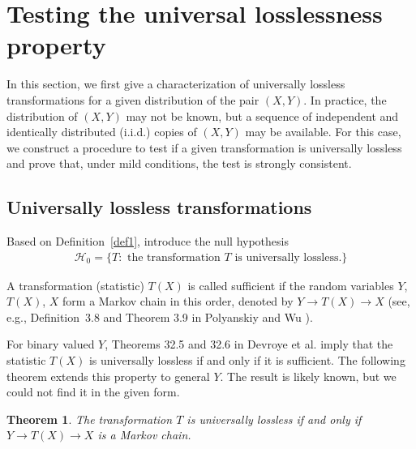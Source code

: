 \documentclass[11pt]{article}
\newtheorem{theorem}{Theorem}
\begin{document}
\section{Testing the universal losslessness property}

\label{sec-lossless}

In this section, we first give a characterization of universally lossless transformations for a given distribution of the pair $(X,Y)$. In practice, the distribution of $(X,Y)$ may not be known, but a sequence of independent and identically distributed (i.i.d$.$) copies of $(X,Y)$ may be available. For this case, we construct a procedure to test if a given transformation is universally  lossless and prove that, under mild conditions,  the test is strongly consistent. 

\subsection{Universally lossless transformations}

\label{sec-univlossless}

Based on Definition~\ref{def1}, introduce  the null hypothesis
\begin{align}
\label{hyp0}
\mathcal H_0=\{T:\mbox{ the transformation } T \mbox{ is universally lossless.}\}  
\end{align}

A transformation (statistic) $T(X)$ is called sufficient if the random variables  $Y$,  $T(X)$, $X$ form a Markov chain in this order, denoted by $Y\to T(X)\to X$ (see, e.g., Definition~3.8 and Theorem 3.9 in Polyanskiy and Wu \cite{PoWu22}). 

For binary valued $Y$, Theorems 32.5 and 32.6 in Devroye et al. \cite{DeGyLu96} imply that the statistic $T(X)$ is universally lossless if and only if it is sufficient. The following theorem extends this property to general $Y$. The result is likely known, but we could not find it in the given form. 





\begin{theorem}
\label{thm2}
The transformation $T$ is universally
lossless if and only if  $Y\to T(X) \to X$ is a Markov chain.
\end{theorem}
\end{document}
